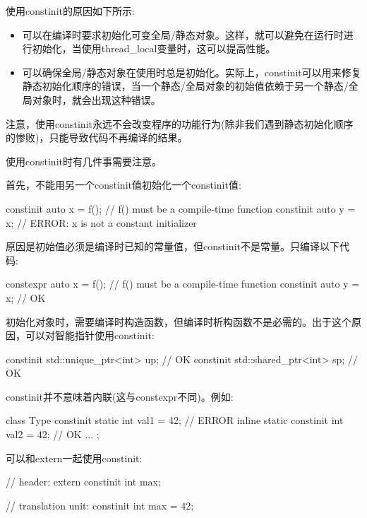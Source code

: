 使用constinit的原因如下所示:

\begin{itemize}
\item 
可以在编译时要求初始化可变全局/静态对象。这样，就可以避免在运行时进行初始化，当使用thread\_local变量时，这可以提高性能。

\item 
可以确保全局/静态对象在使用时总是初始化。实际上，constinit可以用来修复静态初始化顺序的错误，当一个静态/全局对象的初始值依赖于另一个静态/全局对象时，就会出现这种错误。
\end{itemize}

注意，使用constinit永远不会改变程序的功能行为(除非我们遇到静态初始化顺序的惨败)，只能导致代码不再编译的结果。


使用constinit时有几件事需要注意。

首先，不能用另一个constinit值初始化一个constinit值:

\begin{cpp}
constinit auto x = f(); // f() must be a compile-time function
constinit auto y = x; // ERROR: x is not a constant initializer
\end{cpp}

原因是初始值必须是编译时已知的常量值，但constinit不是常量。只编译以下代码:

\begin{cpp}
constexpr auto x = f(); // f() must be a compile-time function
constinit auto y = x; // OK
\end{cpp}

初始化对象时，需要编译时构造函数，但编译时析构函数不是必需的。出于这个原因，可以对智能指针使用constinit:

\begin{cpp}
constinit std::unique_ptr<int> up; // OK
constinit std::shared_ptr<int> sp; // OK
\end{cpp}

constinit并不意味着内联(这与constexpr不同)。例如:

\begin{cpp}
class Type {
	constinit static int val1 = 42; // ERROR
	inline static constinit int val2 = 42; // OK
	...
};
\end{cpp}

可以和extern一起使用constinit:

\begin{cpp}
// header:
extern constinit int max;

// translation unit:
constinit int max = 42;
\end{cpp}

